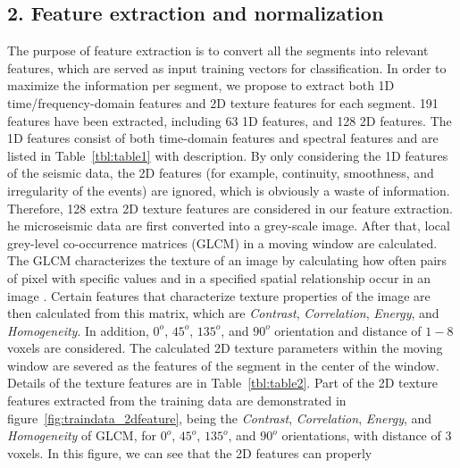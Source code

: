 \subsection{2. Feature extraction and normalization}
The purpose of feature extraction is to convert all the segments into relevant features, which are served as input training vectors for classification.  In order to maximize the information per segment, we propose to extract both 1D time/frequency-domain features and 2D texture features for each segment. 191 features have been extracted, including 63 1D features, and 128 2D features. The 1D features consist of both time-domain features and spectral features and are listed in Table~\ref{tbl:table1} with description. By only considering the 1D features of the seismic data, the 2D features (for example, continuity, smoothness, and irregularity of the events) are ignored, which is obviously a waste of information. Therefore, 128 extra 2D texture features are considered in our feature extraction. he microseismic data are first converted into a grey-scale image. After that, local grey-level co-occurrence matrices (GLCM) in a moving window are calculated. The GLCM characterizes the texture of an image by calculating how often pairs of pixel with specific values and in a specified spatial relationship occur in an image \citep{haralick1973textural}. Certain features that characterize texture properties of the image are then calculated from this matrix, which are \textit{Contrast}, \textit{Correlation}, \textit{Energy}, and \textit{Homogeneity}. In addition, $0^o$, $45^o$, $135^o$, and $90^o$ orientation and distance of $1-8$  voxels are considered.  The calculated 2D texture parameters within the moving window are severed as the features of the segment in the center of the window. Details of the texture features are  in Table~\ref{tbl:table2}. Part of the 2D texture features extracted from the training data are demonstrated in figure~\ref{fig:traindata_2dfeature}, being the \textit{Contrast}, \textit{Correlation}, \textit{Energy}, and \textit{Homogeneity} of GLCM, for $0^o$, $45^o$, $135^o$, and $90^o$ orientations, with distance of $3$  voxels. In this figure, we can see that the 2D features can properly 